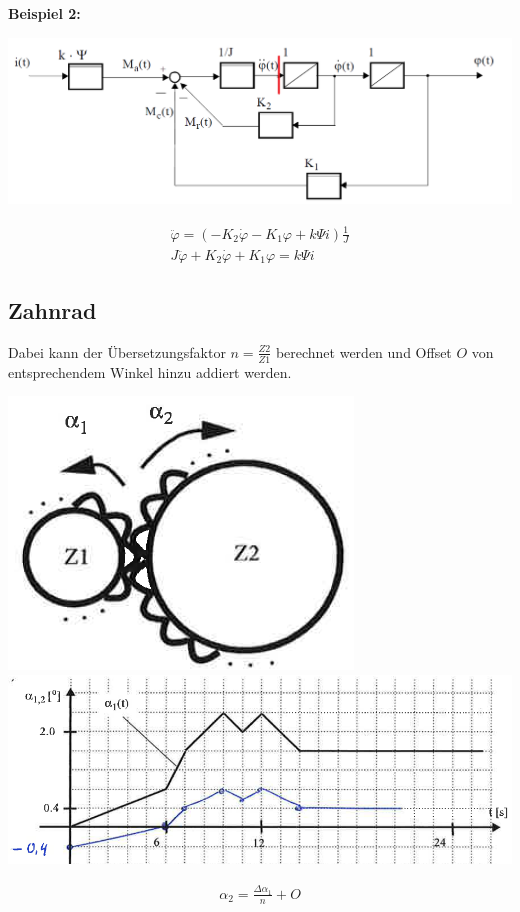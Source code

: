 \noindent\textbf{Beispiel 2:}
\begin{center}
	\includegraphics[width=0.8\columnwidth]{Images/dgl_bestimmen1}
\end{center}
\begin{align*}
	\ddot{\varphi} = \left(-K_2\dot\varphi - K_1\varphi + k\Psi i\right)\frac{1}{J}\\
	J\ddot{\varphi} + K_2\dot\varphi + K_1\varphi = k \Psi i
\end{align*}

\subsection{Zahnrad}
Dabei kann der Übersetzungsfaktor $n = \frac{Z2}{Z1}$ berechnet werden und Offset $O$ von entsprechendem Winkel hinzu addiert werden.
\begin{center}
	\begin{minipage}{0.35\textwidth}
		\begin{center}
			\includegraphics[width=0.25\linewidth,keepaspectratio=true]{Images/zahnrad_I}
			\includegraphics[width=0.5\linewidth,keepaspectratio=true]{Images/zahnrad_I1}
		\end{center}
	\end{minipage}%
	\begin{minipage}{0.15\textwidth}
		\begin{align*}
			\alpha_2 = \frac{\Delta \alpha_1}{n} + O
		\end{align*}
	\end{minipage}
\end{center}

